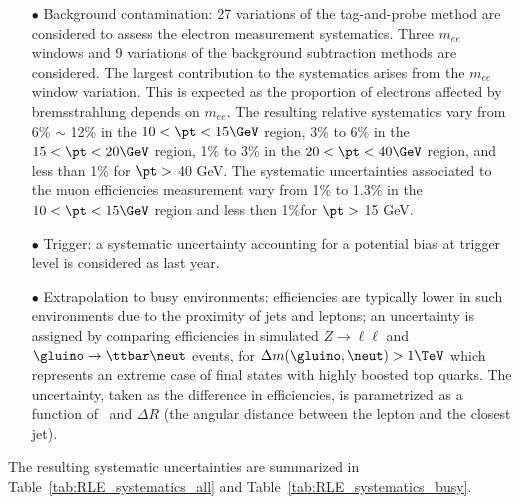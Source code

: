 \begin{itemize}
\item[$\bullet$] Background contamination: 27 variations of the tag-and-probe method are considered to assess the electron measurement systematics.
Three $m_{ee}$ windows and 9 variations of the background subtraction methods are considered.
The largest contribution to the systematics arises from the $m_{ee}$ window variation.
This is expected as the proportion of electrons affected by bremsstrahlung depends on $m_{ee}$.
The resulting relative systematics vary from 6\% $\sim$ 12\% in the $10<\pt<15 \GeV$ region, 3\% to 6\% in the $15<\pt<20 \GeV$ region, 1\% to 3\% in the $20<\pt<40 \GeV$ region, and less than 1\% for $\pt >$ 40 GeV.
The systematic uncertainties associated to the muon efficiencies measurement vary from 1\% to 1.3\% in the $10<\pt<15 \GeV$ region and less then 1\%for $\pt >$ 15 GeV. 
\item[$\bullet$] Trigger: a systematic uncertainty accounting for a potential bias at trigger level is considered as last year.%
\item[$\bullet$] Extrapolation to busy environments: efficiencies are typically lower in such environments due to the proximity of jets and leptons; 
an uncertainty is assigned by comparing efficiencies in simulated $Z\to\ell\ell$ and $\gluino\to\ttbar\neut$ events, for $\Delta m(\gluino,\neut)>1 \TeV$ which represents an extreme case of final states with highly boosted top quarks. 
The uncertainty, taken as the difference in efficiencies, is parametrized as a function of \pt\ and $\Delta R$ (the angular distance between the lepton and the closest jet). 
\end{itemize}
The resulting systematic uncertainties are summarized in Table~\ref{tab:RLE_systematics_all} and Table~\ref{tab:RLE_systematics_busy}.


